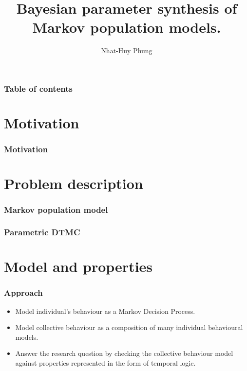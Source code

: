 \documentclass{beamer}
\begin{document}
\title{Bayesian parameter synthesis of Markov population models.}
\author{Nhat-Huy Phung}

\begin{frame}
  \titlepage
\end{frame}

\begin{frame}
  \frametitle{Table of contents}
  \tableofcontents
\end{frame}

\section{Motivation}
\begin{frame}
  \frametitle{Motivation}

\end{frame}

\section{Problem description}
\begin{frame}
  \frametitle{Markov population model}
\end{frame}

\begin{frame}
  \frametitle{Parametric DTMC}
\end{frame}

\section{Model and properties}
\begin{frame}
  \frametitle{Approach}
  \begin{itemize}
    \item Model individual's behaviour as a Markov Decision Process.
    \item Model collective behaviour as a composition of many individual
          behavioural models.
    \item Answer the research question by checking the collective behaviour model
          against properties represented in the form of temporal logic.
  \end{itemize}
\end{frame}
\end{document}

